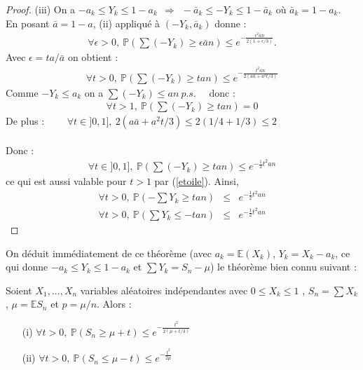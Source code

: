 \begin{proof}
(iii) On a $-a_k\leq Y_k\leq 1-a_k ~~\Rightarrow~~ -\bar a_k \leq -Y_k \leq 1- \bar a_k $  où  $\bar a_k=1-a_k$.\\
En posant $\bar a = 1-a$, (ii) appliqué à $(-Y_k, \bar a_k)$ donne : 
 \begin{eqnarray*}
\forall \epsilon > 0,~ \mathbb{P}(\sum(-Y_k) \geq \epsilon \bar a n) \leq e^{-\frac{\epsilon ^2 \bar a n}{2(1+\epsilon/3)}}. 
\end{eqnarray*}
Avec $\epsilon = ta/\bar a$ on obtient :
\begin{eqnarray*}
\forall t > 0,~\mathbb{P}(\sum(-Y_k) \geq t a n) \leq e^{-\frac{t ^2  a n}{2(a \bar a+a^2t/3)}} 
\end{eqnarray*}
Comme $-Y_k \leq a_k$ on a $\sum(-Y_k) \leq an~ p.s.$~~   donc :
\begin{eqnarray}
\label{etoile} 
\forall t >1,~ \mathbb{P}(\sum(-Y_k) \geq tan)=0
\end{eqnarray}
De plus :   ~~~~$\forall t \in ]0,1],~ 2(a \bar a + a^2t/3) \leq 2(1/4 + 1/3) \leq 2$\\
\\Donc :
\begin{eqnarray*} 
\forall t \in ]0,1],~ \mathbb{P}(\sum(-Y_k) \geq tan) \leq e^{-\frac{1}{2}t^2an}
\end{eqnarray*}
ce qui est aussi valable pour $t>1$ par (\ref{etoile}).
Ainsi,  
\begin{eqnarray*}
\forall t > 0,~ \mathbb{P}(-\sum Y_k \geq tan) &\leq& e^{-\frac{1}{2}t^2an}\\
 \forall t > 0,~ \mathbb{P}(\sum Y_k \leq -tan) &\leq& e^{-\frac{1}{2}t^2an}
\end{eqnarray*}

\end{proof}


On déduit immédiatement de ce théorème (avec $a_k=\mathbb{E}(X_k)$, $Y_k=X_k-a_k$, ce qui donne $-a_k \leq Y_k \leq 1-a_k$ et $\sum Y_k= S_n - \mu$) le théorème bien connu suivant :

\begin{theorem}
Soient $X_1,...,X_n$ variables aléatoires indépendantes avec $0 \leq X_k \leq 1$ , $S_n= \sum X_k$,  $\mu=\mathbb{E} S_n$ et $p=\mu /n$. Alors :
\begin{itemize}
\item[(i)] $\forall  t > 0,~\mathbb{P}(S_n \geq \mu + t) \leq e^{-\frac{t^2}{2(\mu + t/3)}}$  
\item[(ii)] $\forall t > 0,~ \mathbb{P}(S_n \leq \mu-t) \leq e^{-\frac{t^2}{2 \mu}}$
\end{itemize}
\end{theorem} 

